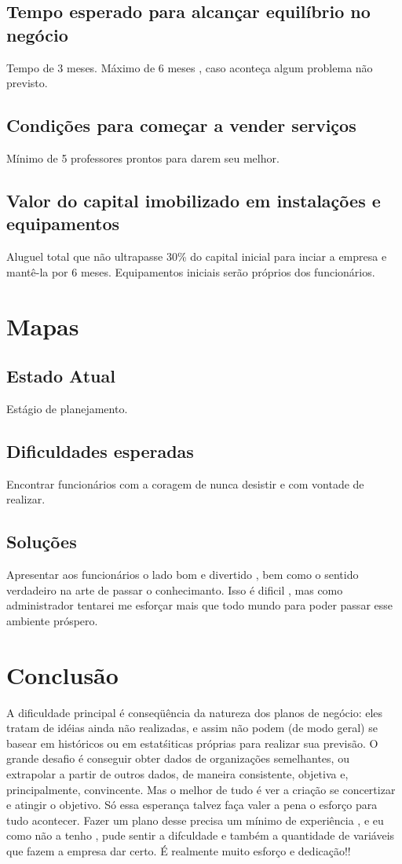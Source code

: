 \documentclass[10pt]{article}
\begin{document}
\subsection{Tempo esperado para alcançar equilíbrio no negócio}
Tempo de 3 meses. Máximo de 6 meses , caso aconteça algum problema não previsto.

\subsection{Condições para começar a vender serviços}
Mínimo de 5 professores prontos para darem seu melhor.

\subsection{Valor do capital imobilizado em instalações e equipamentos}
Aluguel total que não ultrapasse 30\% do capital inicial para inciar a empresa e mantê-la por 6 meses. Equipamentos iniciais serão próprios dos funcionários.

\section{Mapas}

\subsection{Estado Atual}
Estágio de planejamento.

\subsection{Dificuldades esperadas}
Encontrar funcionários com a coragem de nunca desistir e com vontade de realizar.

\subsection{Soluções} 
Apresentar aos funcionários o lado bom e divertido , bem como o sentido verdadeiro na arte de passar o conhecimanto. Isso é dificil , mas como administrador tentarei me esforçar mais que todo mundo para poder passar esse ambiente próspero. 

\section{Conclusão}

A dificuldade principal é conseqüência da natureza dos planos de negócio: eles tratam de idéias ainda não realizadas, e assim não podem (de modo geral) se basear em históricos ou em estatśiticas próprias para realizar sua previsão. O grande desafio é conseguir obter dados de organizações semelhantes, ou extrapolar a partir de outros dados, de maneira consistente, objetiva e, principalmente, convincente. Mas o melhor de tudo é ver a criação se concertizar e atingir o objetivo. Só essa esperança talvez faça valer a pena o esforço para tudo acontecer. Fazer um plano desse precisa um mínimo de experiência , e eu como não a tenho , pude sentir a difculdade e também a quantidade de variáveis que fazem a empresa dar certo. É realmente muito esforço e dedicação!!
\end{document}
